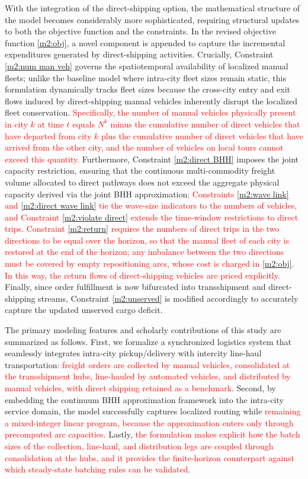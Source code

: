 \documentclass[10pt, reqno]{amsart}
\begin{document}
With the integration of the direct-shipping option, the mathematical structure of the model becomes considerably more sophisticated, requiring structural updates to both the objective function and the constraints. In the revised objective function \eqref{m2:obj}, a novel component is appended to capture the incremental expenditures generated by direct-shipping activities. Crucially, Constraint \eqref{m2:num man veh} governs the spatiotemporal availability of localized manual fleets; unlike the baseline model where intra-city fleet sizes remain static, this formulation dynamically tracks fleet sizes because the cross-city entry and exit flows induced by direct-shipping manual vehicles inherently disrupt the localized fleet conservation. \textcolor{red}{Specifically, the number of manual vehicles physically present in city $k$ at time $t$ equals $N^k$ minus the cumulative number of direct vehicles that have departed from city $k$ plus the cumulative number of direct vehicles that have arrived from the other city, and the number of vehicles on local tours cannot exceed this quantity.} Furthermore, Constraint \eqref{m2:direct BHH} imposes the joint capacity restriction, ensuring that the continuous multi-commodity freight volume allocated to direct pathways does not exceed the aggregate physical capacity derived via the joint BHH approximation\textcolor{red}{; Constraints \eqref{m2:wave link} and \eqref{m2:direct wave link} tie the wave-size indicators to the numbers of vehicles, and Constraint \eqref{m2:violate direct} extends the time-window restrictions to direct trips}. \textcolor{red}{Constraint \eqref{m2:return} requires the numbers of direct trips in the two directions to be equal over the horizon, so that the manual fleet of each city is restored at the end of the horizon; any imbalance between the two directions must be covered by empty repositioning arcs, whose cost is charged in \eqref{m2:obj}. In this way, the return flows of direct-shipping vehicles are priced explicitly.} Finally, since order fulfillment is now bifurcated into transshipment and direct-shipping streams, Constraint \eqref{m2:unserved} is modified accordingly to accurately capture the updated unserved cargo deficit.

The primary modeling features and scholarly contributions of this study are summarized as follows. First, we formalize a synchronized logistics system that seamlessly integrates intra-city pickup/delivery with intercity line-haul transportation\textcolor{red}{: freight orders are collected by manual vehicles, consolidated at the transshipment hubs, line-hauled by automated vehicles, and distributed by manual vehicles, with direct shipping retained as a benchmark}. Second, by embedding the continuum BHH approximation framework into the intra-city service domain, the model successfully captures localized routing while \textcolor{red}{remaining a mixed-integer linear program, because the approximation enters only through precomputed arc capacities}. Lastly, \textcolor{red}{the formulation makes explicit how the batch sizes of the collection, line-haul, and distribution legs are coupled through consolidation at the hubs, and it provides the finite-horizon counterpart against which steady-state batching rules can be validated}.
\end{document}
